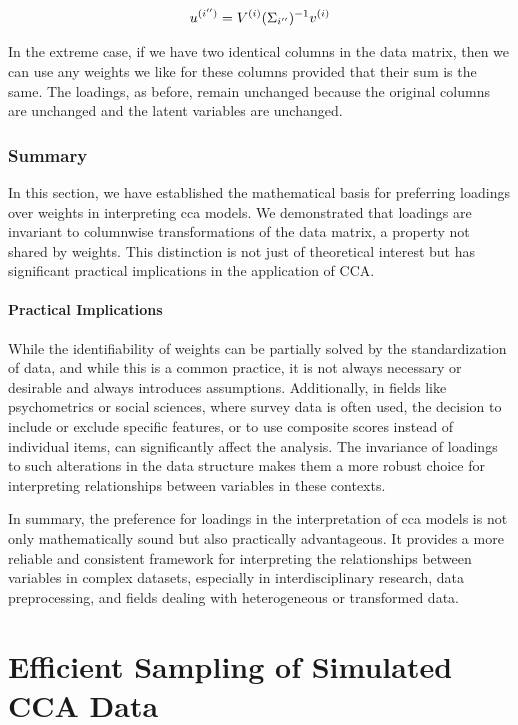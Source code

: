 \begin{align}
    u^{(i'')} = V^{(i)}(\Sigma_{i''})^{-1}v^{(i)} \label{eq:weights_change}
\end{align}

In the extreme case, if we have two identical columns in the data matrix, then we can use any weights we like for these columns provided that their sum is the same.
The loadings, as before, remain unchanged because the original columns are unchanged and the latent variables are unchanged.

\subsubsection{Summary}

In this section, we have established the mathematical basis for preferring \gls{loadings} over weights in interpreting \acrshort{cca} models.
We demonstrated that \gls{loadings} are invariant to columnwise transformations of the data matrix, a property not shared by weights.
This distinction is not just of theoretical interest but has significant practical implications in the application of CCA.

\paragraph{Practical Implications}

While the identifiability of weights can be partially solved by the standardization of data, and while this is a common practice, it is not always necessary or desirable and always introduces assumptions.
Additionally, in fields like psychometrics or social sciences, where survey data is often used, the decision to include or exclude specific features, or to use composite scores instead of individual items, can significantly affect the analysis.
The invariance of \gls{loadings} to such alterations in the data structure makes them a more robust choice for interpreting relationships between variables in these contexts.

In summary, the preference for \gls{loadings} in the interpretation of \acrshort{cca} models is not only mathematically sound but also practically advantageous.
It provides a more reliable and consistent framework for interpreting the relationships between variables in complex datasets, especially in interdisciplinary research, data preprocessing, and fields dealing with heterogeneous or transformed data.

\section{Efficient Sampling of Simulated CCA Data}\label{sec:efficient}

